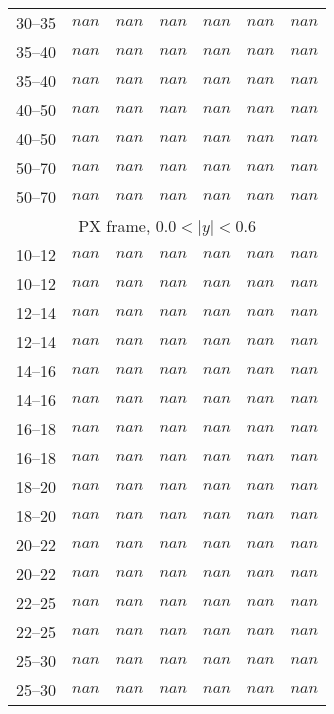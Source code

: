 \documentclass{article}
\begin{document}
\begin{table}[!h]
\begin{tabular}{|c|cccccc|}
30--35   &  $nan$  & $nan$  &  $nan$ &  $nan$  & $nan$  &  $nan$ \\
35--40   &  $nan$  & $nan$  &  $nan$ &  $nan$  & $nan$  &  $nan$ \\
35--40   &  $nan$  & $nan$  &  $nan$ &  $nan$  & $nan$  &  $nan$ \\
40--50   &  $nan$  & $nan$  &  $nan$ &  $nan$  & $nan$  &  $nan$ \\
40--50   &  $nan$  & $nan$  &  $nan$ &  $nan$  & $nan$  &  $nan$ \\
50--70   &  $nan$  & $nan$  &  $nan$ &  $nan$  & $nan$  &  $nan$ \\
50--70   &  $nan$  & $nan$  &  $nan$ &  $nan$  & $nan$  &  $nan$ \\
\hline \multicolumn{7}{|c|}{PX frame, $0.0 < |y| < 0.6$}\\ \hline \rule{0pt}{4mm}
10--12   &  $nan$  & $nan$  &  $nan$ &  $nan$  & $nan$  &  $nan$ \\
10--12   &  $nan$  & $nan$  &  $nan$ &  $nan$  & $nan$  &  $nan$ \\
12--14   &  $nan$  & $nan$  &  $nan$ &  $nan$  & $nan$  &  $nan$ \\
12--14   &  $nan$  & $nan$  &  $nan$ &  $nan$  & $nan$  &  $nan$ \\
14--16   &  $nan$  & $nan$  &  $nan$ &  $nan$  & $nan$  &  $nan$ \\
14--16   &  $nan$  & $nan$  &  $nan$ &  $nan$  & $nan$  &  $nan$ \\
16--18   &  $nan$  & $nan$  &  $nan$ &  $nan$  & $nan$  &  $nan$ \\
16--18   &  $nan$  & $nan$  &  $nan$ &  $nan$  & $nan$  &  $nan$ \\
18--20   &  $nan$  & $nan$  &  $nan$ &  $nan$  & $nan$  &  $nan$ \\
18--20   &  $nan$  & $nan$  &  $nan$ &  $nan$  & $nan$  &  $nan$ \\
20--22   &  $nan$  & $nan$  &  $nan$ &  $nan$  & $nan$  &  $nan$ \\
20--22   &  $nan$  & $nan$  &  $nan$ &  $nan$  & $nan$  &  $nan$ \\
22--25   &  $nan$  & $nan$  &  $nan$ &  $nan$  & $nan$  &  $nan$ \\
22--25   &  $nan$  & $nan$  &  $nan$ &  $nan$  & $nan$  &  $nan$ \\
25--30   &  $nan$  & $nan$  &  $nan$ &  $nan$  & $nan$  &  $nan$ \\
25--30   &  $nan$  & $nan$  &  $nan$ &  $nan$  & $nan$  &  $nan$ \\

\end{tabular}
\end{table}
\end{document}
